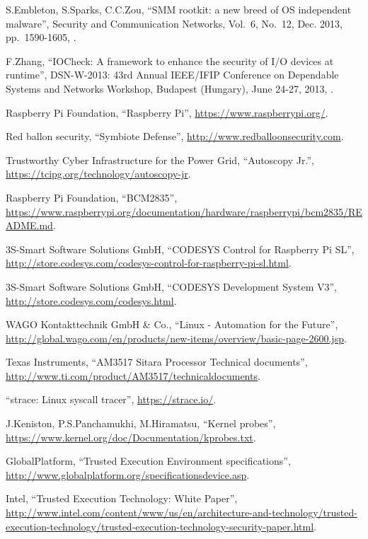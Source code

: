 \begin{thebibliography}{99}
S.Embleton, S.Sparks, C.C.Zou,
``SMM rootkit: a new breed of OS independent malware'',
Security and Communication Networks,
Vol.\ 6, No.\ 12,
Dec. 2013,
pp.\ 1590-1605,
.

F.Zhang,
``IOCheck: A framework to enhance the security of I/O devices at runtime'',
DSN-W-2013: 43rd Annual IEEE/IFIP Conference on Dependable Systems and Networks Workshop,
Budapest (Hungary), June 24-27, 2013,
.

Raspberry Pi Foundation,
``Raspberry Pi'',
\url{https://www.raspberrypi.org/}.

Red ballon security,
``Symbiote Defense'',
\url{http://www.redballoonsecurity.com}.

Trustworthy Cyber Infrastructure for the Power Grid,
``Autoscopy Jr.'',
\url{https://tcipg.org/technology/autoscopy-jr}.

Raspberry Pi Foundation,
``BCM2835'',
\url{https://www.raspberrypi.org/documentation/hardware/raspberrypi/bcm2835/README.md}.

3S-Smart Software Solutions GmbH,
``CODESYS Control for Raspberry Pi SL'',
\url{http://store.codesys.com/codesys-control-for-raspberry-pi-sl.html}.

3S-Smart Software Solutions GmbH,
``CODESYS Development System V3'',
\url{http://store.codesys.com/codesys.html}.

WAGO Kontakttechnik GmbH \& Co.,
``Linux - Automation for the Future'',
\url{http://global.wago.com/en/products/new-items/overview/basic-page-2600.jsp}.

Texas Instruments,
``AM3517 Sitara Processor Technical documents'',
\url{http://www.ti.com/product/AM3517/technicaldocuments}.

``strace: Linux syscall tracer'',
\url{https://strace.io/}.

J.Keniston, P.S.Panchamukhi, M.Hiramatsu,
``Kernel probes'',
\url{https://www.kernel.org/doc/Documentation/kprobes.txt}.

GlobalPlatform,
``Trusted Execution Environment specifications'',
\url{http://www.globalplatform.org/specificationsdevice.asp}.

Intel,
``Trusted Execution Technology: White Paper'',
\url{http://www.intel.com/content/www/us/en/architecture-and-technology/trusted-execution-technology/trusted-execution-technology-security-paper.html}.


\end{thebibliography}
